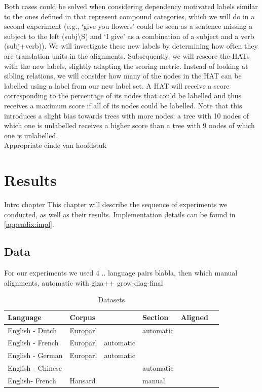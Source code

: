 \documentclass{report}
\theoremstyle{definition}
\theoremstyle{plain}
\begin{document}
Both cases could be solved when considering dependency motivated labels similar to the ones defined in \cite{zollmann2006syntax} that represent compound categories, which we will do in a second experiment (e.g., `give you flowers' could be seen as a sentence missing a subject to the left (subj\textbackslash S) and `I give' as a combination of a subject and a verb (subj+verb)). We will investigate these new labels by determining how often they are translation units in the alignments. Subsequently, we will rescore the HATs with the new labels, slightly adapting the scoring metric. Instead of looking at sibling relations, we will consider how many of the nodes in the HAT can be labelled using a label from our new label set. A HAT will receive a score corresponding to the percentage of its nodes that could be labelled and thus receives a maximum score if all of its nodes could be labelled. Note that this introduces a slight bias towards trees with more nodes: a tree with 10 nodes of which one is unlabelled receives a higher score than a tree with 9 nodes of which one is unlabelled.\\
Appropriate einde van hoofdstuk%




%
%


\chapter{Results}

Intro chapter
This chapter will describe the sequence of experiments we conducted, as well as their results. Implementation details can be found in \ref{appendix:impl}. 

\section{Data}

For our experiments we used 4 .. language pairs blabla, then which manual alignments, automatic with giza++ grow-diag-final

\begin{table}
\begin{tabular}{llllll}
Language & Corpus & & Section & Aligned\\
\hline
English - Dutch & Europarl & & automatic \\
English - French & Europarl & automatic \\
English - German & Europarl & automatic \\
English - Chinese & & & automatic \\
English- French & Hansard & & manual\\
\end{tabular}
\caption{Datasets}\label{tab:datasets}
\end{table}
\end{document}
